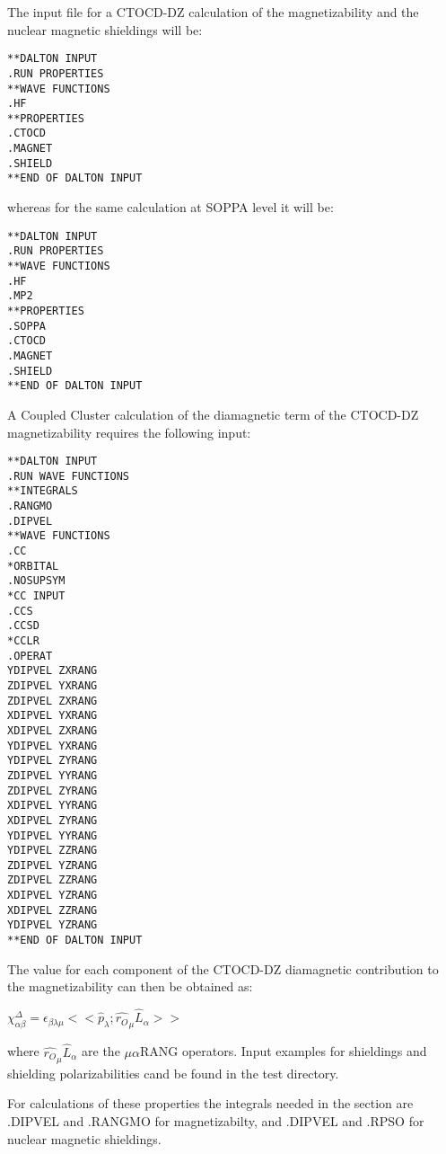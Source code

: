 The input file for a CTOCD-DZ calculation of the magnetizability and
the nuclear magnetic shieldings will be:

\begin{verbatim}
**DALTON INPUT
.RUN PROPERTIES
**WAVE FUNCTIONS
.HF
**PROPERTIES
.CTOCD
.MAGNET
.SHIELD
**END OF DALTON INPUT
\end{verbatim}
whereas for the same calculation at SOPPA level it will be:

\begin{verbatim}
**DALTON INPUT
.RUN PROPERTIES
**WAVE FUNCTIONS
.HF
.MP2
**PROPERTIES
.SOPPA
.CTOCD
.MAGNET
.SHIELD
**END OF DALTON INPUT
\end{verbatim}

A Coupled Cluster calculation of the diamagnetic term of the CTOCD-DZ
magnetizability requires the following input:

\begin{verbatim}
**DALTON INPUT
.RUN WAVE FUNCTIONS
**INTEGRALS
.RANGMO
.DIPVEL
**WAVE FUNCTIONS
.CC
*ORBITAL
.NOSUPSYM
*CC INPUT
.CCS
.CCSD
*CCLR
.OPERAT
YDIPVEL ZXRANG
ZDIPVEL YXRANG
ZDIPVEL ZXRANG
XDIPVEL YXRANG
XDIPVEL ZXRANG
YDIPVEL YXRANG
YDIPVEL ZYRANG
ZDIPVEL YYRANG
ZDIPVEL ZYRANG
XDIPVEL YYRANG
XDIPVEL ZYRANG
YDIPVEL YYRANG
YDIPVEL ZZRANG
ZDIPVEL YZRANG
ZDIPVEL ZZRANG
XDIPVEL YZRANG
XDIPVEL ZZRANG
YDIPVEL YZRANG
**END OF DALTON INPUT
\end{verbatim}

The value for each component of the CTOCD-DZ diamagnetic contribution to the
magnetizability can then be obtained as:
\begin{center}
$\chi_{\alpha\beta}^{\Delta} = \epsilon_{\beta\lambda\mu} 
<< \hat{p}_{\lambda} ; \hat{r_O}_{\mu}\hat{L}_{\alpha} >>$ 
\end{center}
where $\hat{r_O}_{\mu}\hat{L}_{\alpha}$ are the $\mu\alpha$RANG operators.
Input examples for shieldings and shielding polarizabilities cand be found in
the test directory. 

For  calculations of these properties the integrals needed in
the   
section are .DIPVEL and .RANGMO for magnetizabilty, and .DIPVEL and .RPSO for
nuclear magnetic shieldings.

